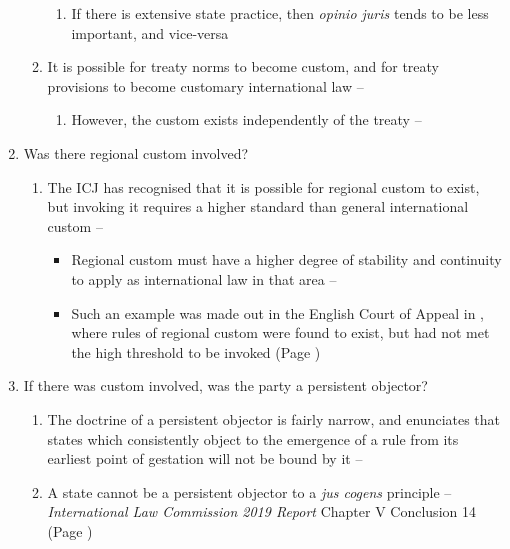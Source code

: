 \begin{enumerate}
\begin{enumerate}
\begin{enumerate}
            \item If there is extensive state practice, then \textit{opinio juris} tends to be less important, and vice-versa
        \end{enumerate}
        \item It is possible for treaty norms to become custom, and for treaty provisions to become customary international law -- 
        \begin{enumerate}
            \item However, the custom exists independently of the treaty -- 
        \end{enumerate}
    \end{enumerate}
    \item Was there regional custom involved?
    \begin{enumerate}
        \item The ICJ has recognised that it is possible for regional custom to exist, but invoking it requires a higher standard than general international custom -- 
        \begin{itemize}
            \item Regional custom must have a higher degree of stability and continuity to apply as international law in that area -- 
            \item Such an example was made out in the English Court of Appeal in , where rules of regional custom were found to exist, but had not met the high threshold to be invoked (Page \pageref{case:R (Al-Saadoon v Sec. of Defence)})
        \end{itemize}
    \end{enumerate}
    \item If there was custom involved, was the party a persistent objector?
    \begin{enumerate}
        \item The doctrine of a persistent objector is fairly narrow, and enunciates that states which consistently object to the emergence of a rule from its earliest point of gestation will not be bound by it -- 
        \item A state cannot be a persistent objector to a \textit{jus cogens} principle -- \textit{International Law Commission 2019 Report} Chapter V Conclusion 14 (Page \pageref{report:2019 ILC Conc. 14})

\end{enumerate}
\end{enumerate}
